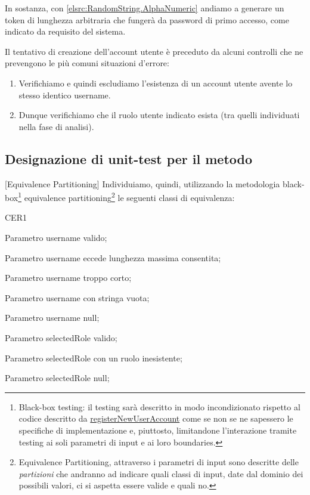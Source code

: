 In sostanza, con \autoref{elsrc:RandomString.AlphaNumeric} andiamo a generare un token di lunghezza arbitraria che fungerà
da password di primo accesso, come indicato da requisito del sistema.
\par\vspace{3mm}
Il tentativo di creazione dell'account utente è preceduto da alcuni controlli che ne prevengono
le più comuni situazioni d'errore:
\begin{enumerate}
	\item Verifichiamo e quindi escludiamo l'esistenza di un account utente avente lo stesso identico username.
	\item Dunque verifichiamo che il ruolo utente indicato esista (tra quelli individuati nella fase di analisi).
\end{enumerate}

\newpage

\subsection{Designazione di unit-test per il metodo}[Equivalence Partitioning]
Individuiamo, quindi, utilizzando la metodologia black-box\footnote{Black-box testing: il testing
sarà descritto in modo incondizionato rispetto al codice descritto da \hyperref[elsrc:registerNewUserAccount]{registerNewUserAccount}
come se non se ne sapessero le specifiche di implementazione e, piuttosto, limitandone l'interazione tramite testing ai soli
parametri di input e ai loro boundaries.} equivalence partitioning\footnote{Equivalence Partitioning, attraverso i parametri 
di input sono descritte delle \textit{partizioni} che andranno ad indicare quali classi di input, date dal dominio dei possibili
valori, ci si aspetta essere valide e quali no.} le seguenti classi di equivalenza:
\begin{eqpart}{CER1}
	\item[CEU1] Parametro username valido;
	\item[CEU2] Parametro username eccede lunghezza massima consentita;
	\item[CEU3] Parametro username troppo corto;
	\item[CEU4] Parametro username con stringa vuota;
	\item[CEU5] Parametro username null;
	\item[CER1] Parametro selectedRole valido;
	\item[CER2] Parametro selectedRole con un ruolo inesistente;
	\item[CER3] Parametro selectedRole null;
\end{eqpart}



